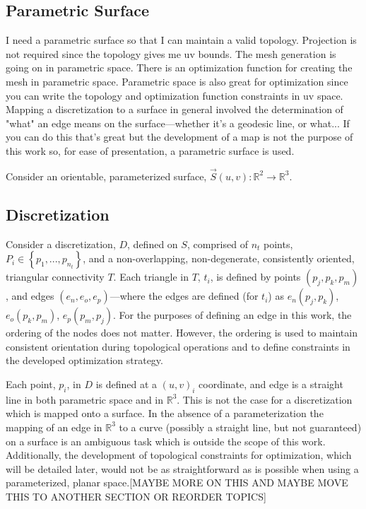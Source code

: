 \subsection{Parametric Surface}
I need a parametric surface so that I can maintain a valid topology.
Projection is not required since the topology gives me uv bounds. The
mesh generation is going on in parametric space. There is an
optimization function for creating the mesh in parametric space. Parametric
space is also great for optimization since you can write the topology
and optimization function constraints in uv space. Mapping a
discretization to a surface in general involved the determination of
"what" an edge means on the surface---whether it's a geodesic line, or
what... If you can do this that's great but the development of a map
is not the purpose of this work so, for ease of presentation, a
parametric surface is used.

Consider an orientable, parameterized surface, $\vec{S}\left(u,v\right)
: {\mathbb R}^2 \rightarrow {\mathbb R}^3$.

\subsection{Discretization}
Consider a discretization, $D$, defined on $S$, comprised of $n_t$
points, $P_i \in \left\{p_1,...,p_{n_t} \right\}$, and a
non-overlapping, non-degenerate, consistently oriented, triangular
connectivity $T$. Each triangle in $T$, $t_i$, is defined by points
$\left(p_j, p_k, p_m\right)$, and edges $\left(e_n, e_o,
e_p\right)$---where the edges are defined (for $t_i$) as $e_n
\left(p_j, p_k\right)$, $e_o \left(p_k, p_m\right)$, $e_p \left(p_m,
p_j\right)$. For the purposes of defining an edge in this work, the
ordering of the nodes does not matter. However, the ordering is used to
maintain consistent orientation during topological operations and to
define constraints in the developed optimization strategy.

Each point, $p_i$, in $D$ is defined at a $\left(u,v\right)_i$
coordinate, and edge is a straight line in both parametric space and in
${\mathbb R}^3$. This is not the case for a discretization which is
mapped onto a surface. In the absence of a parameterization the mapping
of an edge in ${\mathbb R}^3$ to a curve (possibly a straight line, but
    not guaranteed) on a surface is an ambiguous task which is outside
the scope of this work. Additionally, the development of topological
constraints for optimization, which will be detailed later, would not be
as straightforward as is possible when using a parameterized, planar
space.[MAYBE MORE ON THIS AND MAYBE MOVE THIS TO ANOTHER SECTION OR
REORDER TOPICS]

